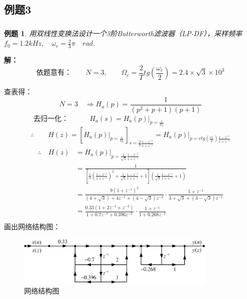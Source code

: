 \documentclass[notheorems,compress,mathserif,table]{beamer}
\newtheorem{example}{例题}
\begin{document}
\subsection{例题3}
\begin{frame}[allowframebreaks]\frametitle{}%
\begin{example}
用双线性变换法设计一个3阶Butterworth滤波器（LP-DF），采样频率$f_0 = 1.2kHz,\quad\omega_c = \frac{2}{3}\pi\quad rad$.
\end{example}
\textbf{解：}
$$\mbox{依题意有：}\quad\quad
N =3,\quad\quad \Omega_c = \frac{2}{T}tg(\frac{\omega_c}{2})=2.4\times\sqrt{3}\times 10^3$$
\par 查表得：
$$N = 3\quad \Longrightarrow H_a(p) = \frac{1}{(p^2 + p+1)(p+1)}$$
\newpage
$$\mbox{去归一化：}\quad\quad\quad
      H_a(s) = H_a(p)|_{p=\frac{s}{\Omega_c}}
\quad\quad\quad\quad\quad\quad\quad\quad\quad$$
$$\therefore\quad\quad H(z) = \left[H_a(p)\Big|_{p=\frac{s}{\Omega_c}}\right]
  _{s=\frac{2}{T}\frac{1-z^{-1}}{1+z^{-1}}}
  = H_a(p)\Big|_{p=ctg(\frac{\omega_c}{2})\frac{1-z^{-1}}{1+z^{-1}}}$$
\begin{equation*}
  \begin{split}
      \therefore\quad H(z)
           &= H_a(p)\Big|_{p=\frac{1}{\sqrt{3}}\frac{1-z^{-1}}{1+z^{-1}}}\\
           &= \frac{1}{\left[
              \frac{1}{3}(\frac{1-z^{-1}}{1+z^{-1}})^2 +
              \frac{1}{\sqrt{3}}\frac{1-z^{-1}}{1+z^{-1}}+1\right]
              (\frac{1}{\sqrt{3}}\frac{1-z^{-1}}{1+z^{-1}}+1)}\\
           &= \frac{9(1+z^{-1})^2}{(4+\sqrt{3})+4z^{-1}+(4-\sqrt{3})z^{-2}}\cdot
              \frac{1+z^{-1}}{3+\sqrt{3}+(3-\sqrt{3})z^{-1}}\\
           &= \frac{0.33(1+2z^{-1}+z^{-2})}{1+0.7z^{-1}+0.396z^{-2}}\cdot
              \frac{1+z^{-1}}{1+0.268z^{-1}}\\
  \end{split}
  \end{equation*}
  \newpage
  画出网络结构图：
  \begin{figure}[h]
    \centering
    \includegraphics[width=0.85\textwidth]{fig25_example3.jpg}
    \caption{网络结构图}
    \label{}
  \end{figure}
\end{frame}


\end{document}
